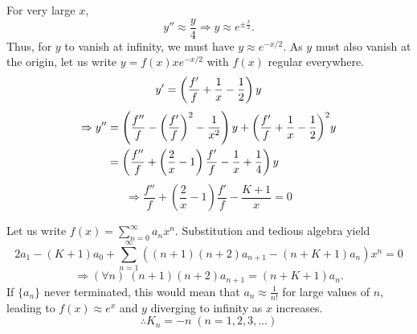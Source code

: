 \item
For very large $x$,
\[
	y'' \approx \frac{y}{4}
	\Rightarrow y \approx e^{\pm \frac{x}{2}}.
\]
Thus, for $y$ to vanish at infinity, we must have $y \approx e^{-x / 2}$.
As $y$ must also vanish at the origin, let us write $y = f(x) x e^{-x / 2}$ with $f(x)$ regular everywhere.
\[
	y' = \left( \frac{f'}{f} + \frac{1}{x} - \frac{1}{2} \right) y
\]
\begin{align*}
	\Rightarrow y''
	 & = \left( \frac{f''}{f} - {\left( \frac{f'}{f} \right)}^2 - \frac{1}{x^2} \right) y
	+ {\left( \frac{f'}{f} + \frac{1}{x} - \frac{1}{2} \right)}^2 y                                                     \\
	 & = \left( \frac{f''}{f} + \left( \frac{2}{x} - 1 \right) \frac{f'}{f} - \frac{1}{x} + \frac{1}{4} \right) y
\end{align*}
\[
	\Rightarrow \frac{f''}{f} + \left( \frac{2}{x} - 1 \right) \frac{f'}{f} - \frac{K + 1}{x} = 0
\]

Let us write $f(x) = \sum_{n=0}^\infty a_n x^n$.
Substitution and tedious algebra yield
\[
	2a_1 - (K + 1) a_0 + \sum_{n=1}^\infty ((n + 1)(n + 2)a_{n + 1} - (n + K + 1) a_n) x^n = 0
\]
\[
	\Rightarrow (\forall n)\; (n + 1)(n + 2)a_{n + 1} = (n + K + 1) a_n.
\]
If $\{a_n\}$ never terminated, this would mean that $a_n \approx \frac{1}{n!}$ for large values of $n$,
leading to $f(x) \approx e^x$ and $y$ diverging to infinity as $x$ increases.
\[
	\therefore K_n = -n\; (n = 1, 2, 3, \dots)
\]